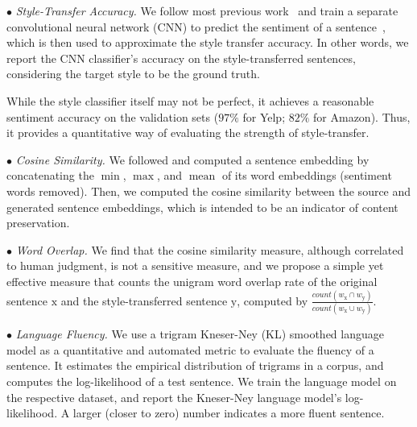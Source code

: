 \documentclass[letterpaper]{article} %
\begin{document}
$\bullet$ \textit{Style-Transfer Accuracy.} We follow most previous work~\cite{hu2017toward,shen2017style,fu2018style} and train a separate convolutional neural network (CNN)  to predict the sentiment of a sentence~\cite{kim2014convolutional}, which is then used to approximate the style transfer accuracy. In other words, we report the CNN classifier's accuracy on the style-transferred sentences, considering the target style to be the ground truth.

While the style classifier itself may not be perfect, it achieves a reasonable sentiment accuracy on the validation sets ($97\%$ for Yelp; $82\%$ for Amazon). Thus, it provides a quantitative way of evaluating the strength of style-transfer.

$\bullet$ \textit{Cosine Similarity.}
We followed \citet{fu2018style} and computed a sentence embedding by concatenating the $\operatorname{min}$, $\operatorname{max}$, and $\operatorname{mean}$ of its word embeddings (sentiment words removed).
Then, we computed the cosine similarity between the source and generated sentence embeddings, which is intended to be an indicator of content preservation.

$\bullet$ \textit{Word Overlap.} We find that the cosine similarity measure, although correlated to human judgment, is not a sensitive measure, and we propose a simple yet effective measure that counts the unigram word overlap rate of the original sentence $\mathrm x$ and the style-transferred sentence $\mathrm y$, computed by $\frac{count(w_{\mathrm x} \cap w_{\mathrm y})}{count(w_{\mathrm x} \cup w_{\mathrm y})}$.

$\bullet$ \textit{Language Fluency.}
We use a trigram Kneser-Ney (KL) smoothed language model \cite{kneser1995improved} as a quantitative and automated metric to evaluate the fluency of a sentence.
It estimates the empirical distribution of trigrams in a corpus, and computes the log-likelihood of a test sentence.
We train the language model on the respective dataset, and report the Kneser-Ney language model's log-likelihood. A larger (closer to zero) number indicates a more fluent sentence.
\end{document}
